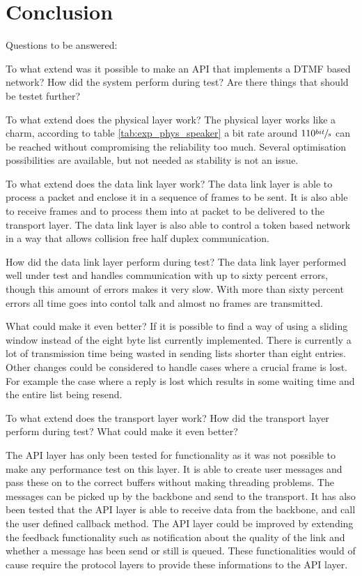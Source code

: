 \chapter{Conclusion}\label{chap:conclusion}
Questions to be answered:

To what extend was it possible to make an API that implements a DTMF based
network?
How did the system perform during test? 
Are there things that should be testet further?

To what extend does the physical layer work? 
The physical layer works like a charm, according to table \ref{tab:exp_phys_speaker} a bit rate around $110\sfrac{bit}{s}$ can be reached without compromising the reliability too much. Several optimisation possibilities are available, but not needed as stability is not an issue.

  To what extend does the data link layer work? 
The data link layer is able to process a packet and enclose it in a sequence of
frames to be sent. It is also able to receive frames and to process them into at
packet to be delivered to the transport layer. The data link layer is also able
to control a token based network in a way that allows collision free half duplex
communication. 

  How did the data link layer perform during test? The data link
layer performed well under test and handles communication with up to sixty
percent errors, though this amount of errors makes it very slow. With more than
sixty percent errors all time goes into contol talk and almost no frames are
transmitted.

  What could make it even better?
If it is possible to find a way of using a sliding window instead of the eight
byte list currently implemented. There is currently a lot of transmission time
being wasted in sending lists shorter than eight entries. Other changes could be
considered to handle cases where a crucial frame is lost. For example the case
where a reply is lost which results in some waiting time and the entire list
being resend.

To what extend does the transport layer work? 
How did the transport layer perform during test?
What could make it even better?

The API layer has only been tested for functionality as it was not possible to make any performance test on this layer. It is able to create user messages and pass these on to the correct buffers without making threading problems. The messages can be picked up by the backbone and send to the transport. It has also been tested that the API layer is able to receive data from the backbone, and call the user defined callback method.
The API layer could be improved by extending the feedback functionality such as notification about the quality of the link and whether a message has been send or still is queued. These functionalities would of cause require the protocol layers to provide these informations to the API layer.


